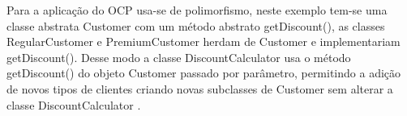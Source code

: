     \par Para a aplicação do OCP usa-se de polimorfismo, neste exemplo tem-se uma classe abstrata Customer com um método abstrato getDiscount(), as classes RegularCustomer e PremiumCustomer herdam de Customer e implementariam getDiscount(). Desse modo a classe DiscountCalculator usa o método getDiscount() do objeto Customer passado por parâmetro, permitindo a adição de novos tipos de clientes criando novas subclasses de Customer sem alterar a classe DiscountCalculator \cite{artigo:ramachandrappa:2024}.


